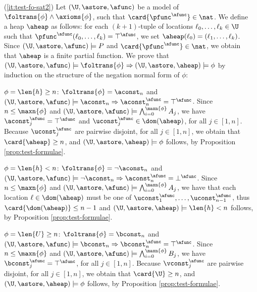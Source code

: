 {    \noindent(\ref{it:test-fo-sat2}) Let $(\U,\astore,\afunc)$ be a
    model of $\foltrans{\phi} \wedge \axioms{\phi}$,
    such that $\card{\pfunc^\afunc} \in \nat$.  We define a heap
    $\aheap$ as follows: for each $(k+1)$-tuple of locations $\ell_0,
    \ldots, \ell_k \in \U$ such that
    $\pfunc^\afunc(\ell_0,\ldots,\ell_k) = \top^\afunc$, we set
    $\aheap(\ell_0) = (\ell_1,\ldots,\ell_k)$. Since
    $(\U,\astore,\afunc) \models P$ and $\card{\pfunc^\afunc} \in
    \nat$, we obtain that $\aheap$ is a finite partial function. We
    prove that $(\U,\astore,\afunc) \models \foltrans{\phi}
    \Rightarrow (\U,\astore,\aheap) \models \phi$ by induction on the
    structure of the negation normal form of
    $\phi$: \begin{compactitem}
    \item $\phi = \len{h} \geq n$: $\foltrans{\phi} = \aconst_n$ and
      $(\U,\astore,\afunc) \models \aconst_n \Rightarrow
      \aconst_n^\afunc = \top^\afunc$. Since $n \leq \maxn{\phi}$ and
      $(\U,\astore,\afunc) \models \bigwedge_{i=0}^{\maxn{\phi}} A_j$,
      we have $\aconst_j^\afunc = \top^\afunc$ and $\uconst_j^\afunc
      \in \dom(\aheap)$, for all $j \in [1,n]$. Because
      $\uconst_j^\afunc$ are pairwise disjoint, for all $j \in [1,n]$,
      we obtain that $\card{\aheap} \geq n$, and $(\U,\astore,\aheap)
      \models \phi$ follows, by Proposition \ref{prop:test-formulae}.
    \item $\phi = \len{h} < n$: $\foltrans{\phi} = \neg\aconst_n$ and
      $(\U,\astore,\afunc) \models \neg\aconst_n \Rightarrow
      \aconst_n^\afunc = \bot^\afunc$. Since $n \leq \maxn{\phi}$ and
      $(\U,\astore,\afunc) \models \bigwedge_{i=0}^{\maxn{\phi}} A_j$,
      we have that each location $\ell\in\dom(\aheap)$ must be one of
      $\uconst_1^\afunc, \ldots, \uconst_{n-1}^\afunc$, thus
      $\card{\dom(\aheap)} \leq n-1$ and $(\U,\astore,\aheap) \models
      \len{h} < n$ follows, by Proposition \ref{prop:test-formulae}.
    \item $\phi = \len{U} \geq n$: $\foltrans{\phi} = \bconst_n$ and
      $(\U,\astore,\afunc) \models \bconst_n \Rightarrow
      \bconst_n^\afunc = \top^\afunc$. Since $n \leq \maxn{\phi}$ and
      $(\U,\astore,\afunc) \models \bigwedge_{i=0}^{\maxn{\phi}} B_j$,
      we have $\bconst_j^\afunc = \top^\afunc$, for all $j \in
      [1,n]$. Because $\vconst_j^\afunc$ are pairwise disjoint, for
      all $j \in [1,n]$, we obtain that $\card{\U} \geq n$, and
      $(\U,\astore,\aheap) \models \phi$ follows, by Proposition
      \ref{prop:test-formulae}.

\end{compactitem}}
